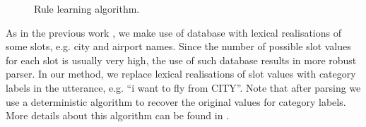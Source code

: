 \documentclass{article}
\begin{document}
\begin{figure}
\vspace{-0.25cm}
\caption{Rule learning algorithm.}
\label{alg:tbl:learning}
\end{figure} 

As in the previous work \cite{mairesse09,he05,zettlemoyer07,meza08b}, we make use of database with lexical realisations of some slots, e.g. city and airport names. Since the number of possible slot values for each slot is usually very high, the use of such database results in more robust parser. In our method, we replace lexical realisations of slot values with category labels in the utterance, e.g. ``i want to fly from CITY''. 
Note that after parsing we use a deterministic algorithm to recover the original values for category labels. More details about this algorithm can be found in \cite{mairesse09}.


\end{document}
